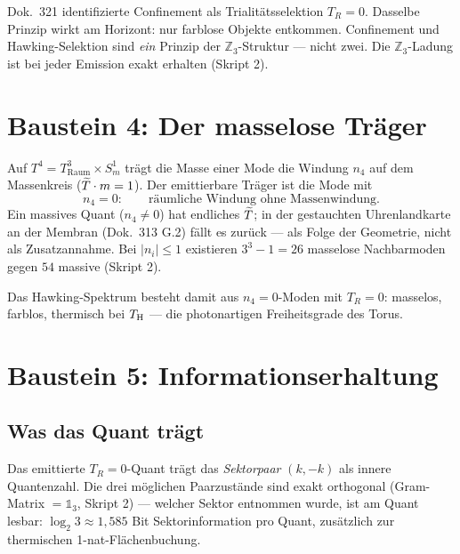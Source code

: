 \begin{tcolorbox}[ffgftbox, title={Confinement $=$ Hawking-Selektion \B}]
  Dok.\ 321 identifizierte Confinement als Trialitätsselektion $T_R = 0$.
  Dasselbe Prinzip wirkt am Horizont: nur farblose Objekte entkommen.
  Confinement und Hawking-Selektion sind \emph{ein} Prinzip
  der $\mathbb{Z}_3$-Struktur — nicht zwei.
  Die $\mathbb{Z}_3$-Ladung ist bei jeder Emission exakt erhalten
  (Skript 2).
\end{tcolorbox}

\section{Baustein 4: Der masselose Träger}

Auf $T^4 = T^3_{\mathrm{Raum}}\times S^1_m$ trägt die Masse einer Mode
die Windung $n_4$ auf dem Massenkreis ($\widetilde{T}\cdot m = 1$).
Der emittierbare Träger ist die Mode mit
\begin{equation}
  n_4 = 0:\qquad \text{räumliche Windung ohne Massenwindung.}
\end{equation}
Ein massives Quant ($n_4 \neq 0$) hat endliches $\widetilde{T}$; in der
gestauchten Uhrenlandkarte an der Membran (Dok.\ 313 G.2) fällt es
zurück — als Folge der Geometrie, nicht als Zusatzannahme.
Bei $|n_i| \leq 1$ existieren $3^3 - 1 = 26$ masselose
Nachbarmoden gegen $54$ massive (Skript 2). \K

Das Hawking-Spektrum besteht damit aus $n_4 = 0$-Moden mit $T_R = 0$:
masselos, farblos, thermisch bei $T_{\mathrm{H}}$ — die photonartigen Freiheitsgrade
des Torus.

\section{Baustein 5: Informationserhaltung}

\subsection{Was das Quant trägt}

Das emittierte $T_R = 0$-Quant trägt das \emph{Sektorpaar} $(k, -k)$
als innere Quantenzahl. Die drei möglichen Paarzustände sind exakt
orthogonal (Gram-Matrix $= \mathbb{1}_3$, Skript 2) — welcher Sektor
entnommen wurde, ist am Quant lesbar:
$\log_2 3 \approx 1{,}585$ Bit Sektorinformation pro Quant,
zusätzlich zur thermischen 1-nat-Flächenbuchung.

